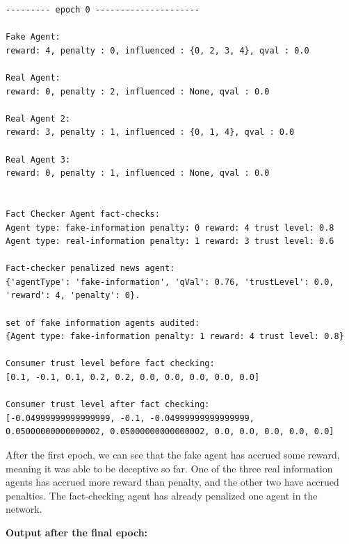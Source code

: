\documentclass[twoside]{article}
\begin{document}
\begin{verbatim}
--------- epoch 0 ---------------------

Fake Agent: 
reward: 4, penalty : 0, influenced : {0, 2, 3, 4}, qval : 0.0

Real Agent: 
reward: 0, penalty : 2, influenced : None, qval : 0.0

Real Agent 2: 
reward: 3, penalty : 1, influenced : {0, 1, 4}, qval : 0.0

Real Agent 3: 
reward: 0, penalty : 1, influenced : None, qval : 0.0


Fact Checker Agent fact-checks: 
Agent type: fake-information penalty: 0 reward: 4 trust level: 0.8
Agent type: real-information penalty: 1 reward: 3 trust level: 0.6

Fact-checker penalized news agent: 
{'agentType': 'fake-information', 'qVal': 0.76, 'trustLevel': 0.0, 'reward': 4, 'penalty': 0}.

set of fake information agents audited:  
{Agent type: fake-information penalty: 1 reward: 4 trust level: 0.8}

Consumer trust level before fact checking:
[0.1, -0.1, 0.1, 0.2, 0.2, 0.0, 0.0, 0.0, 0.0, 0.0]

Consumer trust level after fact checking: 
[-0.04999999999999999, -0.1, -0.04999999999999999, 
0.05000000000000002, 0.05000000000000002, 0.0, 0.0, 0.0, 0.0, 0.0]

\end{verbatim}

After the first epoch, we can see that the fake agent has accrued some reward, meaning it was able to be deceptive so far. One of the three real information agents has accrued more reward than penalty, and the other two have accrued penalties. The fact-checking agent has already penalized one agent in the network.

\textbf{Output after the final epoch: }
\end{document}

